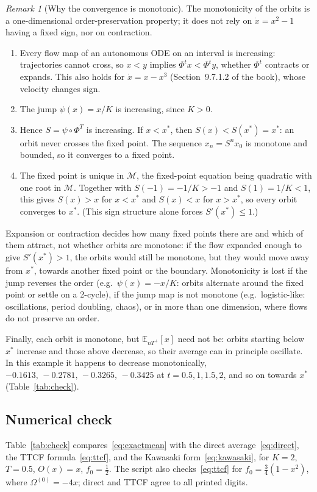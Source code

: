 \documentclass[11pt,a4paper]{article}
\theoremstyle{remark}
\newtheorem{remark}{Remark}
\newcommand{\E}{\mathbb{E}}
\newcommand{\M}{\mathcal{M}}
\begin{document}
\begin{remark}[Why the convergence is monotonic]
The monotonicity of the orbits is a one-dimensional order-preservation
property; it does not rely on $\dot x=x^2-1$ having a fixed sign, nor on
contraction.
\begin{enumerate}
\item Every flow map of an autonomous ODE on an interval is increasing:
  trajectories cannot cross, so $x<y$ implies $\Phi^tx<\Phi^ty$, whether
  $\Phi^t$ contracts or expands. This also holds for $\dot x=x-x^3$
  (Section~9.7.1.2 of the book), whose velocity changes sign.
\item The jump $\psi(x)=x/K$ is increasing, since $K>0$.
\item Hence $S=\psi\circ\Phi^T$ is increasing. If $x<x^*$, then
  $S(x)<S(x^*)=x^*$: an orbit never crosses the fixed point. The sequence
  $x_n=S^nx_0$ is monotone and bounded, so it converges to a fixed point.
\item The fixed point is unique in $\M$, the fixed-point equation being
  quadratic with one root in $\M$. Together with $S(-1)=-1/K>-1$ and
  $S(1)=1/K<1$, this gives $S(x)>x$ for $x<x^*$ and $S(x)<x$ for $x>x^*$, so
  every orbit converges to $x^*$. (This sign structure alone forces
  $S'(x^*)\le1$.)
\end{enumerate}
Expansion or contraction decides how many fixed points there are and which
of them attract, not whether orbits are monotone: if the flow expanded enough
to give $S'(x^*)>1$, the orbits would still be monotone, but they would move
away from $x^*$, towards another fixed point or the boundary. Monotonicity is
lost if the jump reverses the order (e.g.\ $\psi(x)=-x/K$: orbits alternate
around the fixed point or settle on a 2-cycle), if the jump map is not
monotone (e.g.\ logistic-like: oscillations, period doubling, chaos), or in
more than one dimension, where flows do not preserve an order.

Finally, each orbit is monotone, but $\E_{nT^+}[x]$ need not be: orbits
starting below $x^*$ increase and those above decrease, so their average can
in principle oscillate. In this example it happens to decrease monotonically,
$-0.1613,\,-0.2781,\,-0.3265,\,-0.3425$ at $t=0.5,1,1.5,2$, and so on
towards $x^*$ (Table~\ref{tab:check}).
\end{remark}

\subsection{Numerical check}
Table~\ref{tab:check} compares~\eqref{eq:exactmean} with the direct
average~\eqref{eq:direct}, the TTCF formula~\eqref{eq:ttcf}, and the Kawasaki
form~\eqref{eq:kawasaki}, for $K=2$, $T=0.5$, $O(x)=x$, $f_0=\frac12$. The
script also checks~\eqref{eq:ttcf} for $f_0=\frac34(1-x^2)$, where
$\Omega^{(0)}=-4x$; direct and TTCF agree to all printed digits.
\end{document}
